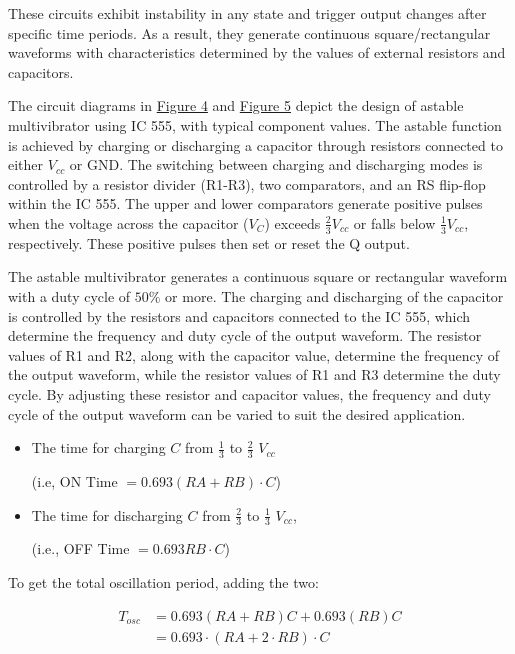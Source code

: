 		These circuits exhibit instability in any state and trigger output changes after specific time periods. As a result, they generate continuous square/rectangular waveforms with characteristics determined by the values of external resistors and capacitors.

		The circuit diagrams in \hyperref[th:4]{Figure 4} and \hyperref[th:5]{Figure 5} depict the design of astable multivibrator using IC 555, with typical component values. The astable function is achieved by charging or discharging a capacitor through resistors connected to either $V_{cc}$ or GND. The switching between charging and discharging modes is controlled by a resistor divider (R1-R3), two comparators, and an RS flip-flop within the IC 555. The upper and lower comparators generate positive pulses when the voltage across the capacitor ($V_C$) exceeds $\frac{2}{3}V_{cc}$ or falls below $\frac{1}{3}V_{cc}$, respectively. These positive pulses then set or reset the Q output.

		The astable multivibrator generates a continuous square or rectangular waveform with a duty cycle of $50\%$ or more. The charging and discharging of the capacitor is controlled by the resistors and capacitors connected to the IC 555, which determine the frequency and duty cycle of the output waveform. The resistor values of R1 and R2, along with the capacitor value, determine the frequency of the output waveform, while the resistor values of R1 and R3 determine the duty cycle. By adjusting these resistor and capacitor values, the frequency and duty cycle of the output waveform can be varied to suit the desired application.

		\begin{itemize}
			\item The time for charging $C$ from $\frac{1}{3}$ to $\frac{2}{3}$ $V_{cc}$

			(i.e, ON Time $= 0.693 (RA + RB)\cdot C$)

			\item The time for discharging $C$ from $\frac{2}{3}$ to $\frac{1}{3}$ $V_{cc}$,
		
			(i.e., OFF Time $= 0.693 RB\cdot C$)
		\end{itemize}

		To get the total oscillation period, adding the two:

		 \begin{equation}
			\begin{split}
				T_{osc}& = 0.693(RA+RB)C + 0.693(RB)C \\
				& =0.693 \cdot (RA + 2\cdot RB) \cdot C
			\end{split}
			\label{eq:1}
		\end{equation}
 
